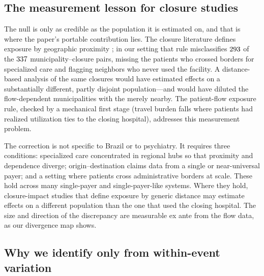 \subsection{The measurement lesson for closure studies}
\label{sec:discussion-generalize}

The null is only as credible as the population it is estimated on, and
that is where the paper's portable contribution lies. The closure
literature defines exposure by geographic proximity
\citep{avdic2016, carroll2019, joynt2015, lindrooth2018}; in our setting
that rule misclassifies $293$ of the $337$ municipality--closure pairs,
missing the patients who crossed borders for specialized care and
flagging neighbors who never used the facility. A distance-based
analysis of the same closures would have estimated effects on a
substantially different, partly disjoint population---and would have
diluted the flow-dependent municipalities with the merely nearby. The
patient-flow exposure rule, checked by a mechanical first stage (travel
burden falls where patients had realized utilization ties to the closing
hospital), addresses this measurement problem.

The correction is not specific to Brazil or to psychiatry. It requires
three conditions: specialized care concentrated in regional hubs so that
proximity and dependence diverge; origin--destination claims data from a
single or near-universal payer; and a setting where patients cross
administrative borders at scale. These hold across many single-payer and
single-payer-like systems. Where they hold, closure-impact studies that
define exposure by generic distance may estimate effects on a different
population than the one that used the closing hospital. The size and
direction of the discrepancy are measurable ex ante from the flow data,
as our divergence map shows.

\subsection{Why we identify only from within-event variation}
\label{sec:discussion-crosssection}

